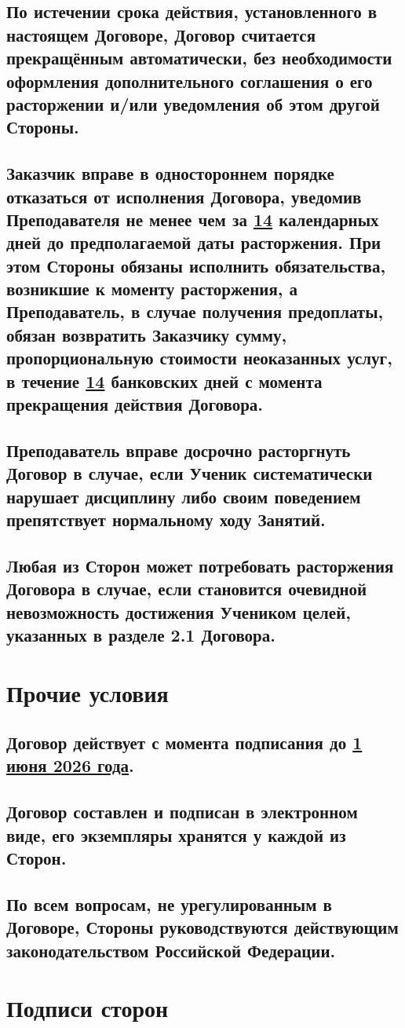 \documentclass[a4paper,12pt]{article}
\begin{document}
\subsection{По истечении срока действия, установленного в настоящем Договоре, Договор считается прекращённым автоматически, без необходимости оформления дополнительного соглашения о его расторжении и/или уведомления об этом другой Стороны.}

\subsection{Заказчик вправе в одностороннем порядке отказаться от исполнения Договора, уведомив Преподавателя не менее чем за \underline{14} календарных дней до предполагаемой даты расторжения. При этом Стороны обязаны исполнить обязательства, возникшие к моменту расторжения, а Преподаватель, в случае получения предоплаты, обязан возвратить Заказчику сумму, пропорциональную стоимости неоказанных услуг, в течение \underline{14} банковских дней с момента прекращения действия Договора.}

\subsection{Преподаватель вправе досрочно расторгнуть Договор в случае, если Ученик систематически нарушает дисциплину либо своим поведением препятствует нормальному ходу Занятий.}

\subsection{Любая из Сторон может потребовать расторжения Договора в случае, если становится очевидной невозможность достижения Учеником целей, указанных в разделе 2.1 Договора.}


\Large\section{Прочие условия}
\subsection{Договор действует с момента подписания до \underline{1 июня 2026 года}.}
\subsection{Договор составлен и подписан в электронном виде, его экземпляры хранятся у каждой из Сторон.}
\subsection{По всем вопросам, не урегулированным в Договоре, Стороны руководствуются действующим законодательством Российской Федерации.}
\newpage
\Large\section{Подписи сторон}
\normalsize
\end{document}
